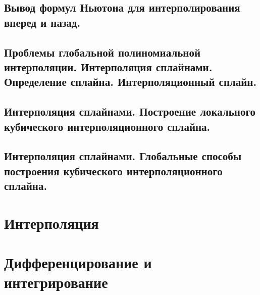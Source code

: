 \documentclass[14pt]{extarticle}
\begin{document}
\clearpage
\subsection{Вывод формул Ньютона для интерполирования вперед и назад.}

\clearpage
\subsection{Проблемы глобальной полиномиальной интерполяции. Интерполяция сплайнами. Определение сплайна. Интерполяционный сплайн.}

\clearpage
\subsection{Интерполяция сплайнами. Построение локального кубического интерполяционного сплайна.}

\clearpage
\subsection{Интерполяция сплайнами. Глобальные способы построения кубического интерполяционного сплайна.}

\section{Интерполяция}


\section{Дифференцирование и интегрирование}
\end{document}
